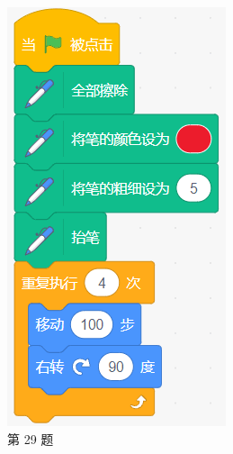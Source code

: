 \documentclass[10pt, a4paper]{article}
\begin{document}
\begin{enumerate}
\begin{figure}[htbp]
\begin{minipage}[t]{.4\textwidth}
\begin{minipage}[t]{.25\textwidth}
                \end{minipage}
                \caption*{第 29 题}
            \end{minipage}
            \begin{minipage}[t]{.13\textwidth}
                \centering
                \includegraphics[width=\textwidth]{figure/30.png}

\end{minipage}
\end{figure}
\end{enumerate}
\end{document}
